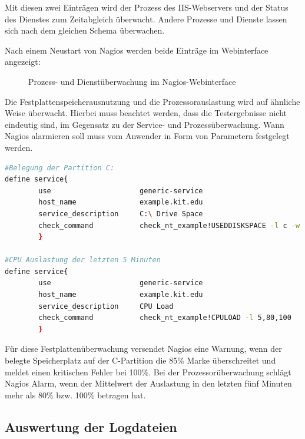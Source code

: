 Mit diesen zwei Einträgen wird der Prozess des \gls{IIS}-Webservers und der Status des Dienstes zum Zeitabgleich überwacht.
Andere Prozesse und Dienste lassen sich nach dem gleichen Schema überwachen.

Nach einem Neustart von Nagios werden beide Einträge im Webinterface angezeigt:

\begin{figure}[ht]
	\centering
		\caption{Prozess- und Dienstüberwachung im Nagios-Webinterface}
		\label{servprocgui}
\end{figure}

Die Festplattenspeicherausnutzung und die Prozessorauslastung wird auf ähnliche Weise überwacht.
Hierbei muss beachtet werden, dass die Testergebnisse nicht eindeutig sind, im Gegensatz zu der Service- und Prozessüberwachung.
Wann Nagios alarmieren soll muss vom Anwender in Form von Parametern festgelegt werden.

\begin{lstlisting}[captionpos=b, caption=Überwachung der Festplatten- und Prozessorauslastung, label=cpuhdddef, breaklines = true, language=sh]
#Belegung der Partition C:
define service{
        use                     generic-service
        host_name               example.kit.edu
        service_description     C:\ Drive Space
        check_command           check_nt_example!USEDDISKSPACE -l c -w 85 -c 100
        }
        
#CPU Auslastung der letzten 5 Minuten
define service{
        use                     generic-service
        host_name               example.kit.edu
        service_description     CPU Load
        check_command           check_nt_example!CPULOAD -l 5,80,100
        }
\end{lstlisting}

Für diese Festplattenüberwachung versendet Nagios eine Warnung, wenn der belegte Speicherplatz auf der C-Partition die 85\% Marke überschreitet und meldet einen kritischen Fehler bei 100\%.
Bei der Prozessorüberwachung schlägt Nagios Alarm, wenn der Mittelwert der Auslastung in den letzten fünf Minuten mehr als 80\% bzw. 100\%  betragen hat.




\subsection{Auswertung der Logdateien}


